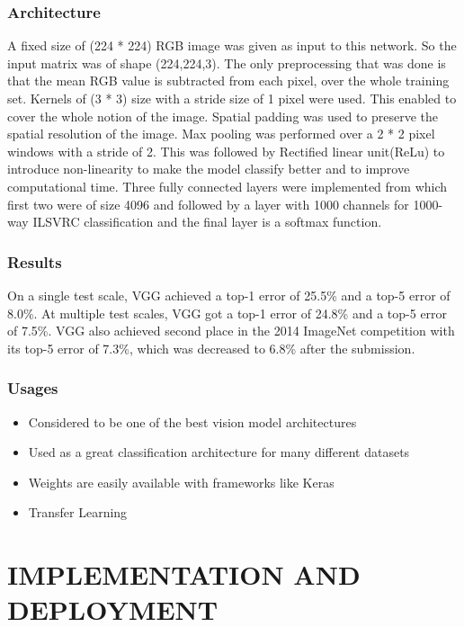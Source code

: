 \subsection{Architecture}
A fixed size of (224 * 224) RGB image was given as input to this network. So the input matrix was of shape (224,224,3).
The only preprocessing that was done is that the mean RGB value is subtracted from each pixel, over the whole training set.
Kernels of (3 * 3) size with a stride size of 1 pixel were used. This enabled to cover the whole notion of the image.
Spatial padding was used to preserve the spatial resolution of the image.
Max pooling was performed over a 2 * 2 pixel windows with a stride of 2.
This was followed by Rectified linear unit(ReLu) to introduce non-linearity to make the model classify better and to improve computational time.
Three fully connected layers were implemented from which first two were of size 4096 and followed by a layer with 1000 channels for 1000-way ILSVRC classification and the final layer is a softmax function.

\subsection{Results}
On a single test scale, VGG achieved a top-1 error of 25.5\% and a top-5 error of 8.0\%. At multiple test scales, VGG got a top-1 error of 24.8\% and a top-5 error of 7.5\%. VGG also achieved second place in the 2014 ImageNet competition with its top-5 error of 7.3\%, which was decreased to 6.8\% after the submission.

\subsection{Usages}
\begin{itemize}
    \item Considered to be one of the best vision model architectures
    \item Used as a great classification architecture for many different datasets
    \item Weights are easily available with frameworks like Keras
    \item Transfer Learning
\end{itemize}


\chapter{IMPLEMENTATION AND DEPLOYMENT}

